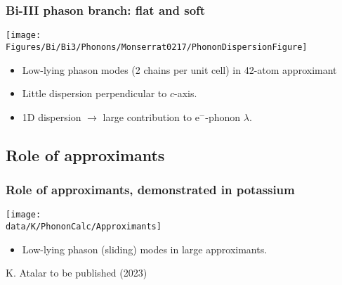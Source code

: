 \begin{frame}
\frametitle{Bi-III phason branch: flat and soft}
\centerline{\texttt{[image: \\Figures/Bi/Bi3/Phonons/Monserrat0217/PhononDispersionFigure]}}
\begin{itemize}
\item
Low-lying phason modes (2 chains per unit cell) in
42-atom approximant
\item
Little dispersion perpendicular to $c$-axis. %
\item
1D dispersion $\rightarrow$ large contribution to e$^-$-phonon $\lambda$.
\end{itemize}

\end{frame}



\subsection{Role of approximants}
\begin{frame}
\frametitle{Role of approximants, demonstrated in potassium}

\centerline{\texttt{[image: \\data/K/PhononCalc/Approximants]}}

\begin{itemize}
\item
Low-lying phason (sliding) modes in large approximants.
\end{itemize}

\vspace*{\fill}
\centerline{\makebox[\linewidth]{\rule{0.85\textwidth}{0.4pt}}}
\centerline{\scriptsize K. Atalar to be published (2023)}

\end{frame}

